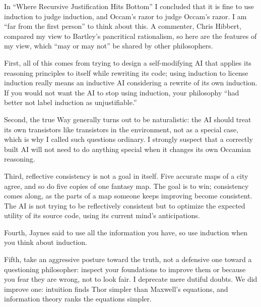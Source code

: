 
In ``Where Recursive Justification Hits Bottom'' I concluded that it is fine to use induction to judge induction, and Occam's razor to judge Occam's razor. I am ``far from the first person'' to think about this. A commenter, Chris Hibbert, compared my view to Bartley's pancritical rationalism, so here are the features of my view, which ``may or may not'' be shared by other philosophers. 

First, all of this comes from trying to design a self-modifying AI that applies its reasoning principles to itself while rewriting its code; using induction to license induction really means an inductive AI considering a rewrite of its own induction. If you would not want the AI to stop using induction, your philosophy ``had better not label induction as unjustifiable.'' 

Second, the true Way generally turns out to be naturalistic: the AI should treat its own transistors like transistors in the environment, not as a special case, which is why I called such questions ordinary. I strongly suspect that a correctly built AI will not need to do anything special when it changes its own Occamian reasoning. 

Third, reflective consistency is not a goal in itself. Five accurate maps of a city agree, and so do five copies of one fantasy map. The goal is to win; consistency comes along, as the parts of a map someone keeps improving become consistent. The AI is not trying to be reflectively consistent but to optimize the expected utility of its source code, using its current mind's anticipations.

Fourth, Jaynes said to use all the information you have, so use induction when you think about induction. 

Fifth, take an aggressive posture toward the truth, not a defensive one toward a questioning philosopher: inspect your foundations to improve them or because you fear they are wrong, not to look fair. I deprecate mere dutiful doubts. We did improve one: intuition finds Thor simpler than Maxwell's equations, and information theory ranks the equations simpler.

